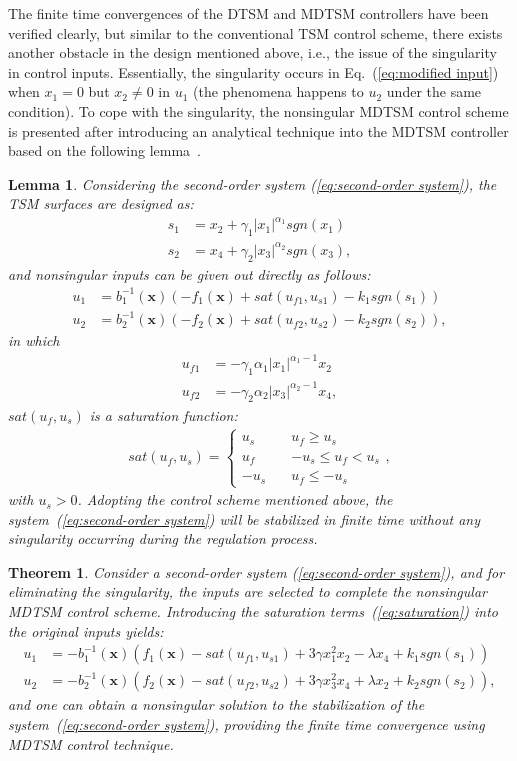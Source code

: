 \documentclass[3p]{elsarticle}
\theoremstyle{plain}
\newtheorem{mylem}{Lemma}
\newtheorem{mythm}{Theorem}
\theoremstyle{remark}
\begin{document}
The finite time convergences of the DTSM and MDTSM controllers have been verified clearly, but similar to the conventional TSM control scheme, there exists another obstacle in the design mentioned above, i.e., the issue of the singularity in control inputs. Essentially, the singularity occurs in Eq.~(\ref{eq:modified input}) when $x_1=0$ but $x_2\neq 0$ in $u_1$ (the phenomena happens to $u_2$ under the same condition). To cope with the singularity, the nonsingular MDTSM control scheme is presented after introducing an analytical technique into the MDTSM controller based on the following lemma~\cite{feng2013nonsingular}.
\begin{mylem}\label{lemma:3}
Considering the second-order system (\ref{eq:second-order system}), the TSM surfaces are designed as:
\begin{align*}
s_1 &= x_2+\gamma_1\vert x_1\vert^{\alpha_1}sgn(x_1)\\
s_2 &= x_4+\gamma_2\vert x_3\vert^{\alpha_2}sgn(x_3),
\end{align*}
and nonsingular inputs can be given out directly as follows:
\begin{align*}
u_1 &= b^{-1}_1(\bm x)(-f_1(\bm x)+sat(u_{f1},u_{s1})-k_1sgn(s_1))\\
u_2 &= b^{-1}_2(\bm x)(-f_2(\bm x)+sat(u_{f2},u_{s2})-k_2sgn(s_2)),
\end{align*}
in which
\begin{align*}
u_{f1}&=-\gamma_1\alpha_1\vert x_1\vert^{\alpha_1-1}x_2\\
u_{f2}&=-\gamma_2\alpha_2\vert x_3\vert^{\alpha_2-1}x_4,
\end{align*}
$sat(u_f,u_s)$ is a saturation function:
\begin{align}
sat(u_f,u_s)=
\begin{cases}
u_s\quad &u_f\ge u_s\\
u_f\quad &-u_s\le u_f< u_s\\
-u_s\quad &u_f\le -u_s\label{eq:saturation}
\end{cases},
\end{align}
with $u_s>0$. Adopting the control scheme mentioned above, the system~(\ref{eq:second-order system}) will be stabilized in finite time without any singularity occurring during the regulation process.
\end{mylem}
\begin{mythm}\label{theorem:3}
Consider a second-order system (\ref{eq:second-order system}), and for eliminating the singularity, the inputs are selected to complete the nonsingular MDTSM control scheme. Introducing the saturation terms~(\ref{eq:saturation}) into the original inputs yields:
\begin{align}
u_1 &= -b_1^{-1}(\bm x)(f_1(\bm x)-sat(u_{f1},u_{s1})+3\gamma x_1^2x_2-\lambda x_4+k_1sgn(s_1))\\
u_2 &= -b_2^{-1}(\bm x)(f_2(\bm x)-sat(u_{f2},u_{s2})+3\gamma x_3^2x_4+\lambda x_2+k_2sgn(s_2)),\label{eq:nonsingular modified input}
\end{align}
and one can obtain a nonsingular solution to the stabilization of the system~(\ref{eq:second-order system}), providing the finite time convergence using MDTSM control technique.
\end{mythm}
\end{document}
